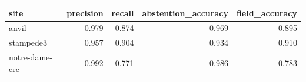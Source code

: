 \begin{tabular}{lrrrr}
\toprule
site & precision & recall & abstention_accuracy & field_accuracy \\
\midrule
anvil & 0.979 & 0.874 & 0.969 & 0.895 \\
stampede3 & 0.957 & 0.904 & 0.934 & 0.910 \\
notre-dame-crc & 0.992 & 0.771 & 0.986 & 0.783 \\
\bottomrule
\end{tabular}
